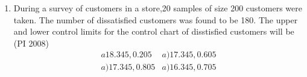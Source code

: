 \documentclass[journal,12pt,onecolumn]{IEEEtran}
\theoremstyle{remark}
\begin{document}
\begin{enumerate}
    \hfill{(PI 2008)}
    \begin{multicols}{4}
    \begin{enumerate}
        \item Rs. $1.00$ lakh
        \item Rs. $0.50$ lakh
        \item Rs. $0.25$ lakh
        \item Rs. $0.125$ lakh
    \end{enumerate}
\end{multicols}
\vspace{1cm}
 \item %
 During a survey of customers in a store,20 samples of size 200 customers were taken. The number of dissatisfied customers was found to be 180. The upper and lower control limits for the control chart of disstisfied customers will be 
    \hfill{(PI 2008)}\\
\[ \begin{matrix}
       { a 18.345,0.205} & { a) 17.345,0.605} \\
       { a) 17.345,0.805} & { a) 16.345,0.705}
    \end{matrix}  \]
   
\vspace{1cm}


\end{enumerate}
\end{document}
